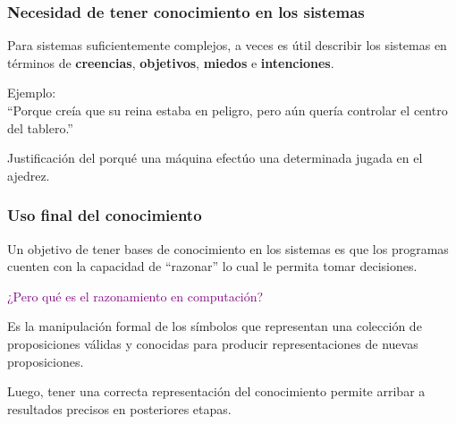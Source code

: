 \documentclass[
10pt, %
aspectratio=169, %
]{beamer}
\begin{document}
	
	\begin{frame}
		
		\frametitle{Necesidad de tener conocimiento en los sistemas}
		
		Para sistemas suficientemente complejos, a veces es útil describir los sistemas en términos de \textbf{creencias}, \textbf{objetivos}, \textbf{miedos} e \textbf{intenciones}.
		
		\vspace{2\baselineskip}
		Ejemplo: \\
			\hspace{2mm} ``Porque creía que su reina estaba en peligro, pero aún quería controlar el centro del tablero.''
			
		\vspace{1\baselineskip}
		\hspace{2mm} Justificación del porqué una máquina efectúo una determinada jugada en el ajedrez.
		
	\end{frame}
	
	\begin{frame}
		
		\frametitle{Uso final del conocimiento}
		
		Un objetivo de tener bases de conocimiento en los sistemas es que los programas cuenten con la capacidad de ``razonar'' lo cual le permita tomar decisiones.
		
		\pause
		\vspace{2\baselineskip}
		\textcolor{purple}{¿Pero qué es el razonamiento en computación?}
				
		\pause
		\begin{alertblock}{}
			Es la manipulación formal de los símbolos que representan una colección de proposiciones válidas y conocidas para producir representaciones de nuevas proposiciones. 
		\end{alertblock}
		
		\pause
		\vspace{2\baselineskip}
		Luego, tener una correcta representación del conocimiento permite arribar a resultados precisos en posteriores etapas.
		
	\end{frame}
	
\end{document}
